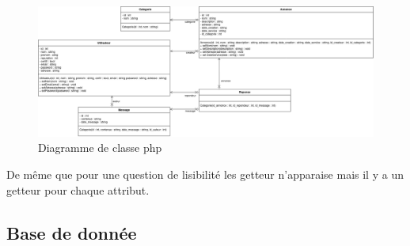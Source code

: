 \documentclass[a4paper,11pt]{article}
\begin{document}
\begin{figure}[H]
  \includegraphics[width=\linewidth]{../Conception/PHP/DC.png}
  \caption{Diagramme de classe php}
  \label{fig:<un-label-court>}
\end{figure}

De même que pour une question de lisibilité les getteur n'apparaise mais il y a un getteur pour chaque attribut.


\subsection{Base de donnée}
\end{document}

